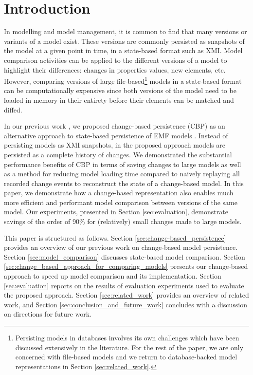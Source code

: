 \section{Introduction}
\label{sec:introduction}

\vspace{-5pt}

In modelling and model management, it is common to find that many versions or variants of a model exist. These versions are commonly persisted as snapshots of the model at a given point in time, in a state-based format such as XMI. Model comparison activities can be applied to the different versions of a model to highlight their differences: changes in properties values, new elements, etc. However, comparing versions of large file-based\footnote{Persisting models in databases involves its own challenges which have been discussed extensively in the literature. For the rest of the paper, we are only concerned with file-based models and we return to database-backed model representations in Section \ref{sec:related_work}.} models in a state-based format can be computationally expensive since both versions of the model need to be loaded in memory in their entirety before their elements can be matched and diffed. %

In our previous work \cite{DBLP:conf/models/YohannisKP17,yohannis2018towards,DBLP:conf/models/YohannisRPK18}, we proposed change-based persistence (CBP) as an alternative approach to state-based persistence of EMF models \cite{steinberg2008emf}. Instead of persisting models as XMI snapshots, in the proposed approach models are persisted as a complete history of changes. We demonstrated the substantial performance benefits of CBP in terms of saving changes to large models \cite{DBLP:conf/models/YohannisKP17} as well as a method for reducing model loading time compared to naively replaying all recorded change events \cite{DBLP:conf/models/YohannisRPK18} to reconstruct the state of a change-based model. 
In this paper, we demonstrate how a change-based representation also enables much more efficient and performant model comparison between versions of the same model. Our experiments, presented in Section \ref{sec:evaluation}, demonstrate savings of the order of 90\% for (relatively) small changes made to large models.

This paper is structured as follows. Section \ref{sec:change-based_persistence} provides an overview of our previous work on change-based model persistence. Section \ref{sec:model_comparison} discusses state-based model comparison. Section \ref{sec:change_based_approach_for_comparing_models} presents our change-based approach to speed up model comparison and its implementation. Section \ref{sec:evaluation} 
reports on the results of evaluation experiments used to evaluate the proposed approach. Section \ref{sec:related_work} provides an overview of related work, and Section \ref{sec:conclusion_and_future_work} concludes with a discussion on directions for future work.

